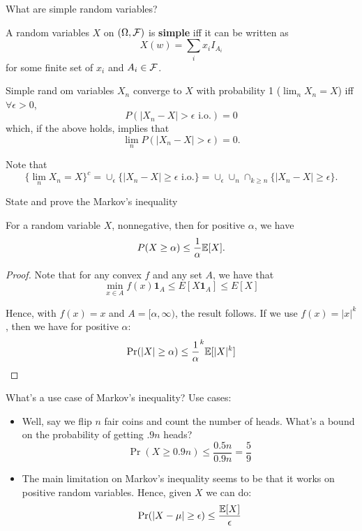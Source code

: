 \documentclass[avery5388,grid,frame]{flashcards}
\begin{document}
\begin{flashcard}
    {What are simple random variables?}
    \begin{definition}
        A random variables $X$ on $(\Omega, \mathcal F)$ is \textbf{simple} iff it can be written as
        $$X(w) = \sum_i x_i I_{A_i}$$
        for some finite set of $x_i$ and $A_i \in \mathcal F$.
    \end{definition}

    \begin{remark}
        Simple rand om variables $X_n$ converge to $X$ with probability 1 ($\lim_n X_n = X$) iff $\forall \epsilon > 0$,
        $$P(|X_n - X| > \epsilon \text{ i.o.}) = 0$$
        which, if the above holds, implies that
        $$\lim_n P(|X_n - X| > \epsilon) = 0.$$

        Note that
        $$\{ \lim_n X_n = X \}^c = \cup_\epsilon \{ | X_n - X | \geq \epsilon \text{ i.o.} \} = \cup_\epsilon \cup_n \cap_{k \geq n} \{ |X_n - X| \geq \epsilon \}.$$
    \end{remark}
\end{flashcard}


\begin{flashcard}
    {State and prove the Markov's inequality}
    \begin{theorem}
        For a random variable $X$, nonnegative, then for positive $\alpha$, we have
        $$P(X \geq \alpha) \leq \frac 1 \alpha \mathbb{E}[X].$$
    \end{theorem}

    \begin{proof}
        Note that for any convex $f$ and any set $A$, we have that
        $$\min_{x \in A} f(x) \mathbf 1_{A} \leq E[X \mathbf 1_{A}] \leq E[X]$$

        Hence, with $f(x) = x$ and $A = [\alpha,\infty)$, the result follows. If we use $f(x) = |x|^k$, then we have for positive $\alpha$:
        $$\Pr(|X| \geq \alpha) \leq \frac 1 \alpha^k \mathbb{E}[|X|^k]$$
    \end{proof}
\end{flashcard}


\begin{flashcard}
    {What's a use case of Markov's inequality?}
    Use cases:
    \begin{itemize}
        \item Well, say we flip $n$ fair coins and count the number of heads. What's a bound on the probability of getting $.9n$ heads?
        $$\Pr(X \geq 0.9n) \leq \frac {0.5n}{0.9n} = \frac 5 9$$
        \item The main limitation on Markov's inequality seems to be that it works on positive random variables. Hence, given $X$ we can do:
        $$\Pr(|X - \mu| \geq \epsilon) \leq \frac{\mathbb{E}[X]}{\epsilon}$$
    \end{itemize}
\end{flashcard}
\end{document}
